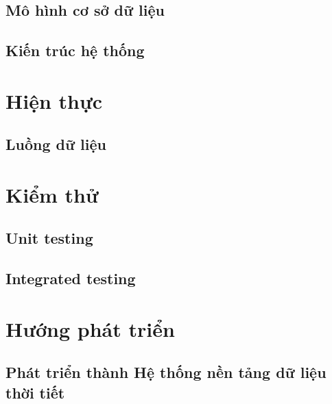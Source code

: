 \documentclass[12pt, a4paper]{report}
\theoremstyle{definition}
\begin{document}
\section{Mô hình cơ sở dữ liệu}

\section{Kiến trúc hệ thống}


\newpage
\chapter{Hiện thực}
\section{Luồng dữ liệu}



\chapter{Kiểm thử}
\section{Unit testing}

\section{Integrated testing}


\newpage
\chapter{Hướng phát triển}
\section*{Phát triển thành Hệ thống nền tảng dữ liệu thời tiết}




\end{document}
